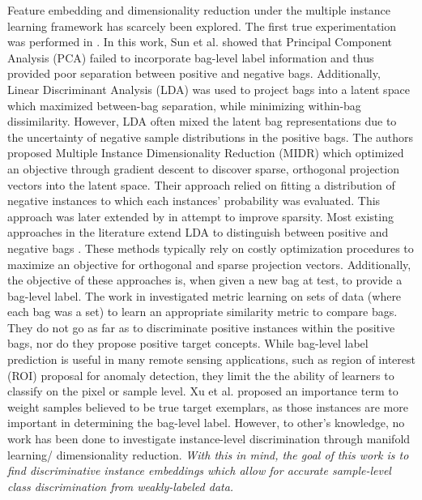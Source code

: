 Feature embedding and dimensionality reduction under the multiple instance learning framework has scarcely been explored.  The first true experimentation was performed in \cite{Sun2010MIDR}.  In this work, Sun et al. showed that Principal Component Analysis (PCA) failed to incorporate bag-level label information and thus provided poor separation between positive and negative bags.  Additionally, Linear Discriminant Analysis (LDA) was used to project bags into a latent space which maximized between-bag separation, while minimizing within-bag dissimilarity.  However, LDA often mixed the latent bag representations due to the uncertainty of negative sample distributions in the positive bags.  The authors proposed Multiple Instance Dimensionality Reduction (MIDR) which optimized an objective through gradient descent to discover sparse, orthogonal projection vectors into the latent space.  Their approach relied on fitting a distribution of negative instances to which each instances' probability was evaluated.  This approach was later extended by \cite{Zhu2018MIDRSparsity} in attempt to improve sparsity.  Most existing approaches in the literature extend LDA to distinguish between positive and negative bags \cite{Chai2014MIDA,Zhu2018MIDRSparsity}.  These methods typically rely on costly optimization procedures to maximize an objective for orthogonal and sparse projection vectors.  Additionally, the objective of these approaches is, when given a new bag at test, to provide a bag-level label.  The work in \cite{Xu2011MI_Metric_Learning} investigated metric learning on sets of data (where each bag was a set) to learn an appropriate similarity metric to compare bags.  They do not go as far as to discriminate positive instances within the positive bags, nor do they propose positive target concepts.  While bag-level label prediction is useful in many remote sensing applications, such as region of interest (ROI) proposal for anomaly detection, they limit the the ability of learners to classify on the pixel or sample level.  Xu et al. proposed an importance term to weight samples believed to be true target exemplars, as those instances are more important in determining the bag-level label.  However, to other's knowledge, no work has been done to investigate instance-level discrimination through manifold learning/ dimensionality reduction.  \textit{With this in mind, the goal of this work is to find discriminative instance embeddings which allow for accurate sample-level class discrimination from weakly-labeled data. }

